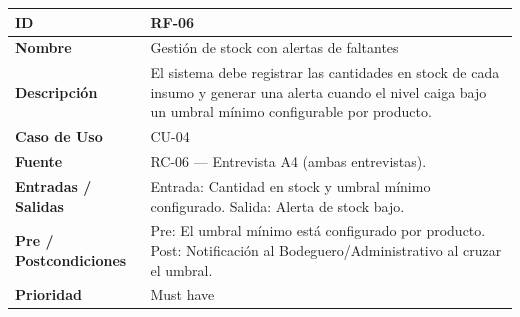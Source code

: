 \documentclass[
]{article}
\newcounter{none} %
\begin{document}
{\def\LTcaptype{none} %
\begin{longtable}[]{|
  >{\raggedright\arraybackslash}p{}|
  >{\raggedright\arraybackslash}p{}|}
\hline
\begin{minipage}[b]{\linewidth}\raggedright
\textbf{ID}
\end{minipage} & \begin{minipage}[b]{\linewidth}\raggedright
RF-06
\end{minipage} \\
\hline
\endhead
\hline
\endlastfoot
\textbf{Nombre} & \begin{minipage}[t]{\linewidth}\raggedright
Gestión de stock con alertas de faltantes
\end{minipage} \\
\hline
\textbf{Descripción} & \begin{minipage}[t]{\linewidth}\raggedright
El sistema debe registrar las cantidades en stock de cada insumo y generar una alerta cuando el nivel caiga bajo un umbral mínimo configurable por producto.
\end{minipage} \\
\hline
\textbf{Caso de Uso} & \begin{minipage}[t]{\linewidth}\raggedright
CU-04
\end{minipage} \\
\hline
\textbf{Fuente} & \begin{minipage}[t]{\linewidth}\raggedright
RC-06 — Entrevista A4 (ambas entrevistas).
\end{minipage} \\
\hline
\textbf{Entradas / Salidas} & \begin{minipage}[t]{\linewidth}\raggedright
Entrada: Cantidad en stock y umbral mínimo configurado. Salida: Alerta de stock bajo.
\end{minipage} \\
\hline
\textbf{Pre / Postcondiciones} & \begin{minipage}[t]{\linewidth}\raggedright
Pre: El umbral mínimo está configurado por producto. Post: Notificación al Bodeguero/Administrativo al cruzar el umbral.
\end{minipage} \\
\hline
\textbf{Prioridad} & \begin{minipage}[t]{\linewidth}\raggedright
Must have
\end{minipage} \\

\end{longtable}}
\end{document}
